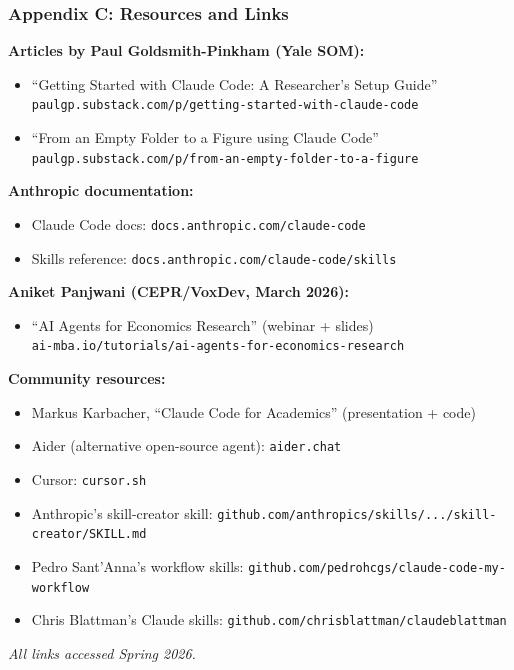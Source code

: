 \documentclass[10pt,english,aspectratio=169]{beamer}
\begin{document}
\begin{frame}
\frametitle{Appendix C: Resources and Links}

\textbf{Articles by Paul Goldsmith-Pinkham (Yale SOM):}
\begin{itemize}
    \item ``Getting Started with Claude Code: A Researcher's Setup Guide'' \\
          \texttt{paulgp.substack.com/p/getting-started-with-claude-code}
    \item ``From an Empty Folder to a Figure using Claude Code'' \\
          \texttt{paulgp.substack.com/p/from-an-empty-folder-to-a-figure}
\end{itemize}

\vspace{0.2cm}

\textbf{Anthropic documentation:}
\begin{itemize}
    \item Claude Code docs: \texttt{docs.anthropic.com/claude-code}
    \item Skills reference: \texttt{docs.anthropic.com/claude-code/skills}
\end{itemize}

\vspace{0.2cm}

\textbf{Aniket Panjwani (CEPR/VoxDev, March 2026):}
\begin{itemize}
    \item ``AI Agents for Economics Research'' (webinar + slides) \\
          \texttt{ai-mba.io/tutorials/ai-agents-for-economics-research}
\end{itemize}

\vspace{0.2cm}

\textbf{Community resources:}
\begin{itemize}
    \item Markus Karbacher, ``Claude Code for Academics'' (presentation + code)
    \item Aider (alternative open-source agent): \texttt{aider.chat}
    \item Cursor: \texttt{cursor.sh}
    \item Anthropic's skill-creator skill: \texttt{github.com/anthropics/skills/.../skill-creator/SKILL.md}
    \item Pedro Sant'Anna's workflow skills: \texttt{github.com/pedrohcgs/claude-code-my-workflow}
    \item Chris Blattman's Claude skills: \texttt{github.com/chrisblattman/claudeblattman}
\end{itemize}

\vspace{0.2cm}

\textit{All links accessed Spring 2026.}
\end{frame}
\end{document}
